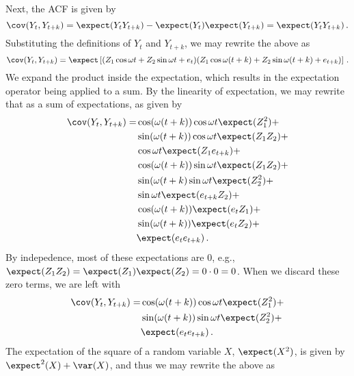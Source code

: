 {Next, the ACF is given by
\begin{equation}
    \cov(Y_t,Y_{t+k}) = \expect(Y_t Y_{t+k}) - \expect(Y_t)\expect(Y_{t+k}) = \expect(Y_t Y_{t+k})\,.
\end{equation}
Substituting the definitions of $Y_t$ and $Y_{t+k}$, we may rewrite the above as
\begin{equation}
    \cov(Y_t,Y_{t+k}) = \expect\left[(Z_1 \cos \omega t + Z_2 \sin \omega t + e_t)(Z_1 \cos \omega (t+k) + Z_2 \sin \omega (t+k) + e_{t+k})\right]\,.
\end{equation}
We expand the product inside the expectation, which results in the expectation operator being applied to a sum.
By the linearity of expectation, we may rewrite that as a sum of expectations, as given by
\begin{equation}
\begin{split}
    \cov(Y_t,Y_{t+k}) =
        &\cos(\omega(t+k)) \cos \omega t \expect(Z^2_1) +\\
        &\sin(\omega(t+k)) \cos \omega t \expect(Z_1 Z_2) +\\
        &\cos \omega t \expect(Z_1 e_{t+k}) +\\
        &\cos(\omega(t+k)) \sin \omega t \expect(Z_1 Z_2) +\\
        &\sin(\omega(t+k) \sin \omega t \expect(Z^2_2) + \\
        &\sin \omega t \expect(e_{t+k} Z_2) +\\
        &\cos(\omega(t+k)) \expect(e_t Z_1) +\\
        &\sin(\omega(t+k)) \expect(e_t Z_2) +\\
        &\expect(e_t e_{t+k})\,.                      
\end{split}
\end{equation}
    By indepedence, most of these expectations are $0$, e.g., $\expect(Z_1 Z_2) = \expect(Z_1) \expect(Z_2) = 0 \cdot 0 = 0$.
When we discard these zero terms, we are left with
\begin{equation}
\begin{split}
    \cov(Y_t,Y_{t+k}) =
        &\cos(\omega(t+k)) \cos \omega t \expect(Z^2_1) +\\
        &\sin(\omega(t+k)) \sin \omega t \expect(Z^2_2) + \\
        &\expect(e_t e_{t+k})\,.
\end{split}
\end{equation}
The expectation of the square of a random variable $X$, $\expect(X^2)$, is given by $\expect^2(X) + \var(X)$, and thus we may rewrite the above as
}
